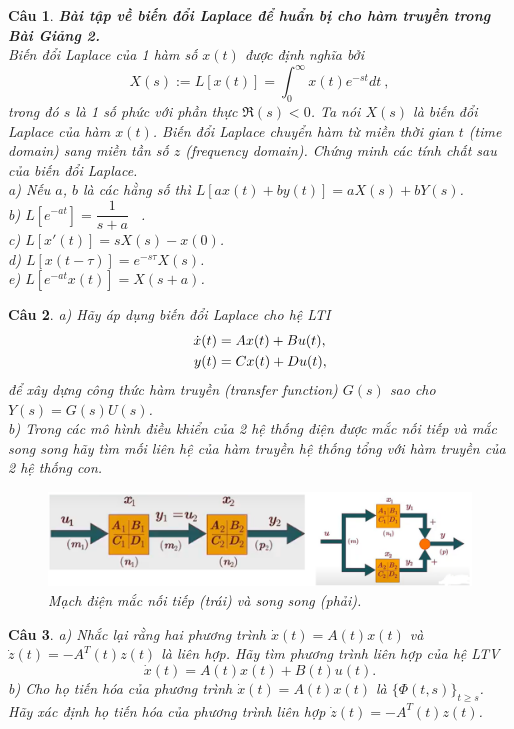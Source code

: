\documentclass[11pt]{article}
\newtheorem{bt}{Câu}
\begin{document}
\pagebreak

\begin{bt} \textbf{Bài tập về biến đổi Laplace để huẩn bị cho hàm truyền trong Bài Giảng 2.} \\
Biến đổi Laplace của 1 hàm số $x(t)$ được định nghĩa bởi
%
\[
X(s) := L[x(t)] = \int_0^{\infty} x(t) e^{-st} dt \ , 
\]
%
trong đó $s$ là 1 số phức với phần thực $\Re(s)<0$. Ta nói $X(s)$ là biến đổi Laplace của hàm $x(t)$. Biến đổi Laplace chuyển hàm từ miền thời gian $t$ (time domain) sang miền tần số $z$ (frequency domain). Chứng minh các tính chất sau của biến đổi Laplace. \\
a) Nếu $a$, $b$ là các hằng số thì $L[ax(t) + by(t)] = a X(s) + b Y(s)$. \\
b) $L[e^{-at}] = \dfrac{1}{s+a}$ \ . \\
c) $L[x'(t)] = s X(s) - x(0)$. \\
d) $L[x(t-\tau)] = e^{-s\tau} X(s)$. \\
e) $L[e^{-at} x(t)] = X(s+a)$. 
\end{bt}   

\begin{bt}
a) Hãy áp dụng biến đổi Laplace cho hệ LTI 
%
\begin{align}\label{3}
\dot{x}(t) &= A x(t) + B u(t), \notag \\
y(t) &= Cx(t) + Du(t),
\end{align}
%
để xây dựng công thức hàm truyền (transfer function) $G(s)$ sao cho $Y(s) = G(s) U(s)$.\\
b) Trong các mô hình điều khiển của 2 hệ thống điện được mắc nối tiếp và mắc song song hãy tìm mối liên hệ của hàm truyền hệ thống tổng với hàm truyền của 2 hệ thống con.

\begin{figure}[h!]
	\centering
	\includegraphics[scale = 0.6]{Figures/Electrical_connection}
	\caption{Mạch điện mắc nối tiếp (trái) và song song (phải).}
	\label{fig:fig1}
\end{figure}


\end{bt}

\begin{bt} 
a) Nhắc lại rằng hai phương trình $\dot{x}(t) = A(t) x(t)$	và $\dot{z}(t) = -A^T(t) z(t)$ là \emph{liên hợp}. Hãy tìm phương trình liên hợp của hệ LTV
%
\begin{equation}\label{3}
	\dot{x}(t) = A(t) x(t) + B(t) u(t).
\end{equation}
%
b) Cho họ tiến hóa của phương trình $\dot{x}(t) = A(t) x(t)$ là $\{\Phi(t,s)\}_{t\geq s}$. Hãy xác định họ tiến hóa của phương trình liên hợp $\dot{z}(t) = -A^T(t) z(t)$.
\end{bt}
\end{document}

